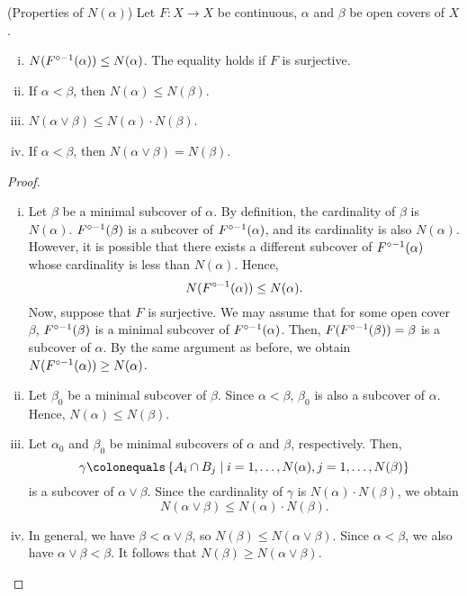 \documentclass[12pt,twoside,draft]{book}
\begin{document}
\begin{proposition}
  (Properties of $N(\alpha)$)
  Let $F: X \to X$ be continuous, $\alpha$ and $\beta$ be open covers of $X$.
  \begin{enumerate}[(i)]
    \item 
      $N(F^{\circ -1}(\alpha)) \leq N(\alpha)$.
      The equality holds if $F$ is surjective.
    \item 
      If $\alpha < \beta$, then $N(\alpha) \leq N(\beta)$.
    \item 
      $N(\alpha \vee \beta) \leq N(\alpha) \cdot N(\beta)$.
    \item 
      If $\alpha < \beta$, then $N(\alpha \vee \beta) = N(\beta)$.
  \end{enumerate}
  \begin{proof}
    \begin{enumerate}[(i)]
      \item 
        Let $\beta$ be a minimal subcover of $\alpha$.
        By definition, the cardinality of $\beta$ is $N(\alpha)$.
        $F^{\circ -1}(\beta)$ is a subcover of $F^{\circ -1}(\alpha)$, and its cardinality is also $N(\alpha)$.
        However, it is possible that there exists a different subcover of $F^{\circ -1}(\alpha)$ whose cardinality is less than $N(\alpha)$.
        Hence, 
        \begin{equation*}
          N(F^{\circ -1}(\alpha)) \leq N(\alpha).
        \end{equation*}
        Now, suppose that $F$ is surjective.
        We may assume that for some open cover $\beta$, $F^{\circ -1}(\beta)$ is a minimal subcover of $F^{\circ -1}(\alpha)$.
        Then, $F(F^{\circ -1}(\beta)) = \beta$ is a subcover of $\alpha$.
        By the same argument as before, we obtain $N(F^{\circ -1}(\alpha)) \geq N(\alpha)$.
      \item
        Let $\beta_0$ be a minimal subcover of $\beta$.
        Since $\alpha < \beta$, $\beta_0$ is also a subcover of $\alpha$.
        Hence, $N(\alpha) \leq N(\beta)$.
      \item
        Let $\alpha_0$ and $\beta_0$ be minimal subcovers of $\alpha$ and $\beta$, respectively.
        Then,
        \begin{equation*}
          \gamma \ceq \setst{A_i \cap B_j}{i = 1, \ldots, N(\alpha), j = 1, \ldots, N(\beta)}
        \end{equation*}
        is a subcover of $\alpha \vee \beta$.
        Since the cardinality of $\gamma$ is $N(\alpha) \cdot N(\beta)$, we obtain
        \begin{equation*}
          N(\alpha \vee \beta) \leq N(\alpha) \cdot N(\beta).
        \end{equation*}
      \item
        In general, we have $\beta < \alpha \vee \beta$, so $N(\beta) \leq N(\alpha \vee \beta)$.
        Since $\alpha < \beta$, we also have $\alpha \vee \beta < \beta$.
        It follows that $N(\beta) \geq N(\alpha \vee \beta)$.
    \end{enumerate}
  \end{proof}
\end{proposition}
\end{document}
